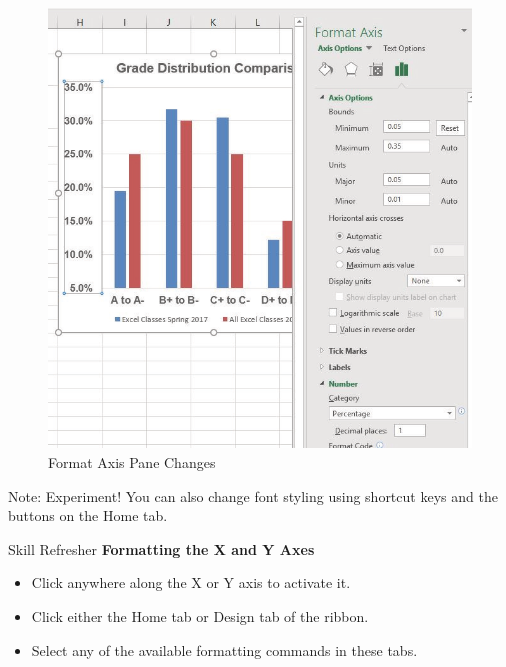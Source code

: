\begin{figure}[H]
	\centering
	\includegraphics[width=\maxwidth{.95\linewidth}]{gfx/ch04_fig29}
	\caption{Format Axis Pane Changes}
	\label{04:fig29}
\end{figure}

Note: Experiment! You can also change font styling using shortcut keys and the buttons on the Home
tab.

\begin{center}
	\begin{sklbox}{Skill Refresher}
		\textbf{Formatting the X and Y Axes}
		\\
		\begin{itemize}
			\setlength{\itemsep}{0pt}
			\setlength{\parskip}{0pt}
			\setlength{\parsep}{0pt}

			\item Click anywhere along the X or Y axis to activate it.
			\item Click either the Home tab or Design tab of the ribbon.
			\item Select any of the available formatting commands in these tabs.
			
		\end{itemize}
	\end{sklbox}
\end{center}


